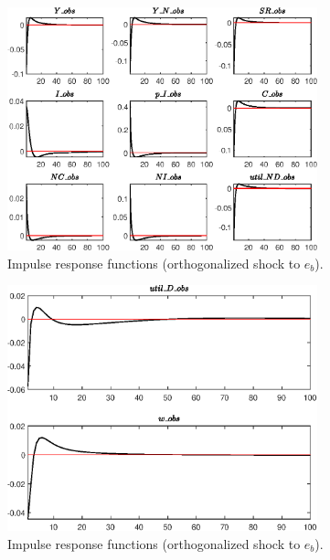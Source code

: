 \begin{figure}[H]
\centering 
\includegraphics[width=0.80\textwidth]{RBC_sectoral/graphs/RBC_sectoral_IRF_e_b1}
\caption{Impulse response functions (orthogonalized shock to ${e_b}$).}\label{Fig:IRF:e_b:1}
\end{figure}
 
\begin{figure}[H]
\centering 
\includegraphics[width=0.80\textwidth]{RBC_sectoral/graphs/RBC_sectoral_IRF_e_b2}
\caption{Impulse response functions (orthogonalized shock to ${e_b}$).}\label{Fig:IRF:e_b:2}
\end{figure}
 
